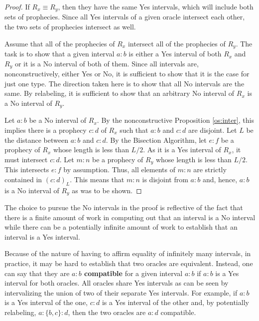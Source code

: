 \documentclass[12pt]{article}
\begin{document}
\begin{proof}\label{os:equal}
    If $R_x \equiv R_y$, then they have the same Yes intervals, which will include both sets of prophecies. Since all Yes intervals of a given oracle intersect each other, the two sets of prophecies intersect as well. 
    
    Assume that all of the prophecies of $R_x$ intersect all of the prophecies of $R_y$. The task is to show that a given interval $a:b$ is either a Yes interval of both $R_x$ and  $R_y$ or it is a No interval of both of them. Since all intervals are, nonconstructively, either Yes or No, it is sufficient to show that it is the case for just one type. The direction taken here is to show that all No intervals are the same. By relabeling, it is sufficient to show that an arbitrary No interval of $R_x$ is a No interval of $R_y$. 

    Let $a:b$ be a No interval of $R_x$. By the nonconstructive Proposition \ref{os:inter}, this implies there is a prophecy $c:d$ of $R_x$ such that $a:b$ and $c:d$ are disjoint. Let $L$ be the distance between $a:b$ and $c:d$. By the Bisection Algorithm, let $e:f$ be a prophecy of $R_x$  whose length is less than $L/2$. As it is a Yes interval of $R_x$, it must intersect $c:d$. Let $m:n$ be a prophecy of $R_y$ whose length is less than $L/2$. This intersects $e:f$ by assumption. Thus, all elements of $m:n$ are strictly contained in $(c:d)_L$. This means that $m:n$ is disjoint from $a:b$ and, hence, $a:b$ is a No interval of $R_y$ as was to be shown. 
\end{proof} 

The choice to pursue the No intervals in the proof is reflective of the fact that there is a finite amount of work in computing out that an interval is a No interval while there can be a potentially infinite amount of work to establish that an interval is a Yes interval. 

Because of the nature of having to affirm equality of infinitely many intervals, in practice, it may be hard to establish that two oracles are equivalent. Instead, one can say that they are \textbf{$a:b$ compatible} for a given interval $a:b$ if $a:b$ is a Yes interval for both oracles. All oracles share Yes intervals as can be seen by intervalizing the union of two of their separate Yes intervals. For example, if $a:b$ is a Yes interval of the one, $c:d$ is a Yes interval of the other and, by potentially relabeling, $a:\{b,c\}:d$, then the two oracles are $a:d$ compatible.  
\end{document}
